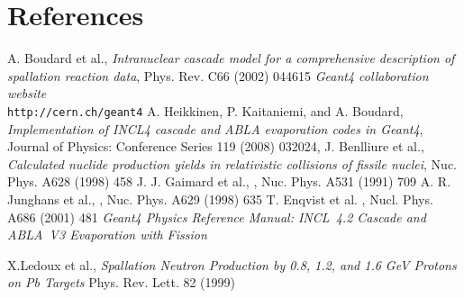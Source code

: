 \documentclass[a4paper]{jpconf}
\begin{document}
\section*{References}


\begin{thebibliography}{9}

 A. Boudard et al., \emph{Intranuclear cascade model for
    a comprehensive description of spallation reaction data}, Phys.
  Rev. C66 (2002) 044615
 \emph{Geant4 collaboration website} \\ {\tt http://\-cern.ch/\-geant4}
A. Heikkinen, P. Kaitaniemi, and A. Boudard,
{\em Implementation of INCL4 cascade and ABLA evaporation codes in Geant4},
Journal of Physics: Conference Series 119 (2008) 032024, 
{\sf [doi:10.1088/1742-6596/119/3/032024]}
 J. Benlliure et al., \emph{Calculated nuclide
    production yields in relativistic collisions of fissile nuclei},
  Nuc. Phys. A628 (1998) 458
 J. J. Gaimard et al., \emph{},
  Nuc. Phys. A531 (1991) 709
 A. R. Junghans et al., \emph{},
  Nuc. Phys. A629 (1998) 635
 T. Enqvist et al. \emph{},
  Nucl. Phys. A686 (2001) 481
 \emph{Geant4 Physics Reference Manual: INCL~4.2 Cascade and ABLA~V3 Evaporation with Fission} 

 X.Ledoux et al., \emph{Spallation Neutron Production by
  0.8, 1.2, and 1.6 GeV Protons on Pb Targets} Phys. Rev. Lett. 82
  (1999)

\end{thebibliography}
\end{document}

